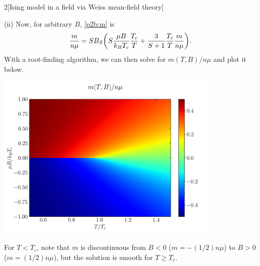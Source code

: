 \documentclass[12pt]{article}
\begin{document}
\begin{problem}{2}[Ising model in a field via Weiss mean-field theory]
\begin{solution}
(ii) Now, for arbitrary $B$, \eqref{p2b:m} is
\begin{equation}
    \frac{m}{n\mu}=SB_S\qty(S\frac{\mu
    B}{k_BT_c}\frac{T_c}{T}+\frac{3}{S+1}\frac{T_c}{T}\frac{m}{n\mu}). 
\end{equation}
With a root-finding algorithm, we can then solve for $m(T,B)/n\mu$ and plot it
below.
\begin{center}
    \includegraphics[width=0.8\textwidth]{p2cii.png} 
\end{center}
For $T<T_c$, note that $m$ is discontinuous from $B<0$ ($m=-(1/2)n\mu$) to $B>0$
($m=(1/2)n\mu$), but the solution is smooth for $T\geq T_c$.
\end{solution}


\end{problem}
\end{document}
